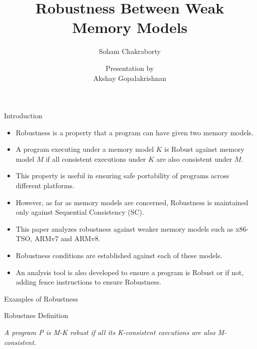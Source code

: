 \documentclass[notes, xcolor=dvipsnames]{beamer}
\title{Robustness Between Weak Memory Models}
\subtitle{Soham Chakraborty}
\author{Presentation by \\ Akshay Gopalakrishnan}
\begin{document}
    
    \begin{frame}

        \maketitle

    \end{frame}

    \begin{frame}{Introduction}

        \begin{itemize}
            \item Robustness is a property that a program can have given two memory models.
            \item A program executing under a memory model $K$ is Robust against memory model $M$ if all consistent executions under $K$ are also consistent under $M$.
            \item This property is useful in ensuring safe portability of programs across different platforms.
            \item However, as far as memory models are concerned, Robustness is maintained only against Sequential Consistency (SC).
            \item This paper analyzes robustness against weaker memory models such as x86-TSO, ARMv7 and ARMv8. 
            \item Robustness conditions are established against each of these models.
            \item An analysis tool is also developed to ensure a program is Robust or if not, adding fence instructions to ensure Robustness.   
        \end{itemize}

    \end{frame}

    \begin{frame}{Examples of Robustness}



    \end{frame}

    \begin{frame}{Robustnes Definition}

        \begin{center}
            \textit{A program P is M-K robust if all its K-consistent executions are also M-consistent.} 
        \end{center}
        

    \end{frame}
\end{document}
